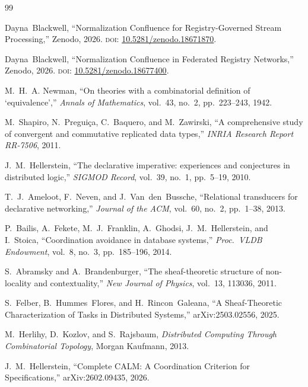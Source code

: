 \documentclass[11pt,a4paper]{article}
\theoremstyle{plain}
\theoremstyle{definition}
\theoremstyle{remark}
\renewcommand{\_}{\origunderscore\allowbreak}
\begin{document}
\begin{thebibliography}{99}

Dayna~Blackwell,
``Normalization Confluence for Registry-Governed Stream Processing,''
Zenodo, 2026.
\textsc{doi}: \href{https://doi.org/10.5281/zenodo.18671870}{10.5281/zenodo.18671870}.

Dayna~Blackwell,
``Normalization Confluence in Federated Registry Networks,''
Zenodo, 2026.
\textsc{doi}: \href{https://doi.org/10.5281/zenodo.18677400}{10.5281/zenodo.18677400}.

M.~H.~A. Newman,
``On theories with a combinatorial definition of `equivalence',''
\emph{Annals of Mathematics}, vol.~43, no.~2, pp.~223--243, 1942.

M.~Shapiro, N.~Pregui\c{c}a, C.~Baquero, and M.~Zawirski,
``A comprehensive study of convergent and commutative replicated data types,''
\emph{INRIA Research Report RR-7506}, 2011.

J.~M.~Hellerstein,
``The declarative imperative: experiences and conjectures in distributed logic,''
\emph{SIGMOD Record}, vol.~39, no.~1, pp.~5--19, 2010.

T.~J.~Ameloot, F.~Neven, and J.~Van~den~Bussche,
``Relational transducers for declarative networking,''
\emph{Journal of the ACM}, vol.~60, no.~2, pp.~1--38, 2013.

P.~Bailis, A.~Fekete, M.~J.~Franklin, A.~Ghodsi, J.~M.~Hellerstein, and I.~Stoica,
``Coordination avoidance in database systems,''
\emph{Proc.\ VLDB Endowment}, vol.~8, no.~3, pp.~185--196, 2014.

S.~Abramsky and A.~Brandenburger,
``The sheaf-theoretic structure of non-locality and contextuality,''
\emph{New Journal of Physics}, vol.~13, 113036, 2011.

S.~Felber, B.~Hummes~Flores, and H.~Rincon~Galeana,
``A Sheaf-Theoretic Characterization of Tasks in Distributed Systems,''
arXiv:2503.02556, 2025.

M.~Herlihy, D.~Kozlov, and S.~Rajsbaum,
\emph{Distributed Computing Through Combinatorial Topology},
Morgan Kaufmann, 2013.

J.~M.~Hellerstein,
``Complete CALM: A Coordination Criterion for Specifications,''
arXiv:2602.09435, 2026.


\end{thebibliography}
\end{document}
